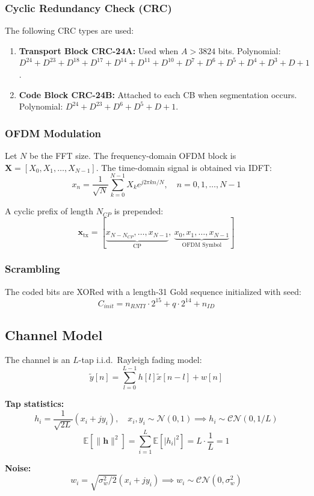 \documentclass[12pt, a4paper]{article}
\begin{document}
\subsubsection{Cyclic Redundancy Check (CRC)}
The following CRC types are used:
\begin{enumerate}
    \item \textbf{Transport Block CRC-24A:} Used when $A > 3824$ bits. Polynomial: $D^{24}+D^{23}+D^{18}+D^{17}+D^{14}+D^{11}+D^{10}+D^{7}+D^6+D^5+D^4+D^3+D+1$.
    \item \textbf{Code Block CRC-24B:} Attached to each CB when segmentation occurs. Polynomial: $D^{24}+D^{23}+D^6+D^5+D+1$.
\end{enumerate}

\subsubsection{OFDM Modulation}
Let $N$ be the FFT size. The frequency-domain OFDM block is $\mathbf{X} = [X_0, X_1, \dots, X_{N-1}]$. The time-domain signal is obtained via IDFT:
$$x_n = \frac{1}{\sqrt{N}} \sum_{k=0}^{N-1} X_k e^{j 2 \pi kn/N}, \quad n = 0, 1, \dots, N-1$$

A cyclic prefix of length $N_{CP}$ is prepended:
$$\mathbf{x}_{\text{tx}} = [\underbrace{x_{N-N_{CP}}, \dots, x_{N-1}}_{\text{CP}},\ \underbrace{x_0, x_1, \dots, x_{N-1}}_{\text{OFDM Symbol}}]$$

\subsubsection{Scrambling}
The coded bits are XORed with a length-31 Gold sequence initialized with seed:
$$C_{init} = n_{RNTI}\cdot 2^{15} + q\cdot 2^{14} + n_{ID}$$

\subsection{Channel Model}
The channel is an $L$-tap i.i.d.\ Rayleigh fading model:
\begin{equation}
    \tilde{y}[n] = \sum_{l=0}^{L-1} h[l]\tilde{x}[n-l] + w[n]
\end{equation}

\textbf{Tap statistics:}
$$h_i = \frac{1}{\sqrt{2L}}(x_i + jy_i),\quad x_i,y_i\sim\mathcal{N}(0,1) \implies h_i\sim\mathcal{CN}(0,1/L)$$
$$\mathbb{E}[\|\mathbf{h}\|^2] = \sum_{i=1}^{L}\mathbb{E}[|h_i|^2] = L\cdot\frac{1}{L} = 1$$

\textbf{Noise:}
$$w_i = \sqrt{\sigma_w^2/2}(x_i+jy_i) \implies w_i\sim\mathcal{CN}(0,\sigma_w^2)$$
\end{document}
